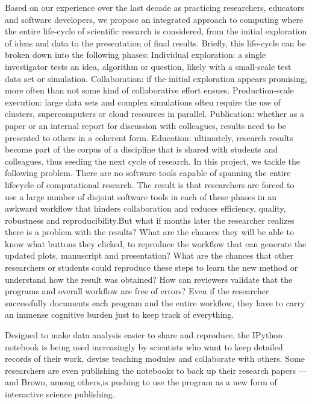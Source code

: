 Based on our experience over the last decade as practicing researchers, educators and software developers, we propose an integrated approach to computing where the entire life-cycle of scientific research is considered, from the initial exploration of ideas and data to the presentation of final results. Briefly, this life-cycle can be broken down into the following phases:
 Individual exploration: a single investigator tests an idea, algorithm or question, likely with a small-scale test data set or simulation.
 Collaboration: if the initial exploration appears promising, more often than not some kind of collaborative effort ensues.
 Production-scale execution: large data sets and complex simulations often require the use of clusters, supercomputers or cloud resources in parallel.
 Publication: whether as a paper or an internal report for discussion with colleagues, results need to be presented to others in a coherent form.
 Education: ultimately, research results become part of the corpus of a discipline that is shared with students and colleagues, thus seeding the next cycle of research.
In this project, we tackle the following problem. There are no software tools capable of spanning the entire lifecycle of computational research. The result is that researchers are forced to use a large number of disjoint software tools in each of these phases in an awkward workflow that hinders collaboration and reduces efficiency, quality, robustness and reproducibility.But what if months later the researcher realizes there is a problem with the results? What are the chances they will be able to know what buttons they clicked, to reproduce the workflow that can generate the updated plots, manuscript and presentation? What are the chances that other researchers or students could reproduce these steps to learn the new method or understand how the result was obtained? How can reviewers validate that the programs and overall workflow are free of errors? Even if the researcher successfully documents each program and the entire workflow, they have to carry an immense cognitive burden just to keep track of everything.



Designed to make data analysis easier to share and reproduce, the IPython notebook is being used increasingly by scientists who want to keep detailed records of their work, devise teaching modules and collaborate with others. Some researchers are even publishing the notebooks to back up their research papers — and Brown, among others,is pushing to use the program as a new form of interactive science publishing. \cite{shen2014interactive}

